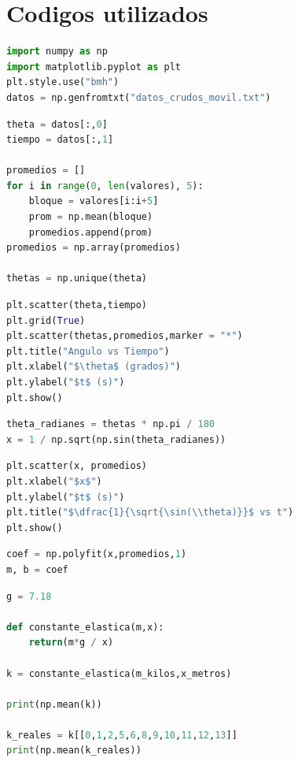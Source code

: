 \documentclass{article}
\begin{document}
\section*{Codigos utilizados}

\begin{lstlisting}[language=Python, caption= Código para importar librerias 
   y datos]
import numpy as np
import matplotlib.pyplot as plt
plt.style.use("bmh")
datos = np.genfromtxt("datos_crudos_movil.txt")
\end{lstlisting}


\begin{lstlisting}[language=Python, caption= Código para calcular promedios de tiempos]
theta = datos[:,0]
tiempo = datos[:,1]

promedios = []
for i in range(0, len(valores), 5):
    bloque = valores[i:i+5]
    prom = np.mean(bloque)
    promedios.append(prom)
promedios = np.array(promedios)

thetas = np.unique(theta) 

\end{lstlisting}

\begin{lstlisting}[language=Python, caption= Código para graficar datos y 
   promedios]
plt.scatter(theta,tiempo)
plt.grid(True)
plt.scatter(thetas,promedios,marker = "*")
plt.title("Angulo vs Tiempo")
plt.xlabel("$\theta$ (grados)")
plt.ylabel("$t$ (s)")
plt.show()
\end{lstlisting}

\begin{lstlisting}[language=Python, caption= Código para pasar 
   ángulos a radianes y linealizar modelo]
theta_radianes = thetas * np.pi / 180
x = 1 / np.sqrt(np.sin(theta_radianes))
\end{lstlisting}

\begin{lstlisting}[language=Python, caption= Código para graficar 
   modelo linealizado]
plt.scatter(x, promedios)
plt.xlabel("$x$")
plt.ylabel("$t$ (s)")
plt.title("$\dfrac{1}{\sqrt{\sin(\\theta)}}$ vs t")
plt.show()
\end{lstlisting}

\begin{lstlisting}[language=Python, caption= Código para el ajuste lineal]
coef = np.polyfit(x,promedios,1)
m, b = coef
\end{lstlisting}

\begin{lstlisting}[language=Python, caption= Código para calcular $k$]
g = 7.18

def constante_elastica(m,x):
    return(m*g / x)

k = constante_elastica(m_kilos,x_metros)

print(np.mean(k))

k_reales = k[[0,1,2,5,6,8,9,10,11,12,13]]
print(np.mean(k_reales))
\end{lstlisting}
\end{document}
